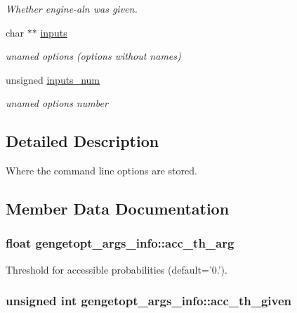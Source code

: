 \begin{DoxyCompactItemize}
\begin{DoxyCompactList}\small\item\em Whether engine-\/aln was given. \end{DoxyCompactList}\item 
char $\ast$$\ast$ \hyperlink{structgengetopt__args__info_a6fe9c1a32bc4c64a2ca4e3cfce05b147}{inputs}
\begin{DoxyCompactList}\small\item\em unamed options (options without names) \end{DoxyCompactList}\item 
unsigned \hyperlink{structgengetopt__args__info_a3d69c180d5ac0b1124fd9a6fe680706c}{inputs\+\_\+num}
\begin{DoxyCompactList}\small\item\em unamed options number \end{DoxyCompactList}\end{DoxyCompactItemize}


\subsection{Detailed Description}
Where the command line options are stored. 

\subsection{Member Data Documentation}
\hypertarget{structgengetopt__args__info_add7c709ed6c1601e389c7373250e4117}{
\subsubsection[{acc\+\_\+th\+\_\+arg}]{\setlength{\rightskip}{0pt plus 5cm}float gengetopt\+\_\+args\+\_\+info\+::acc\+\_\+th\+\_\+arg}}\label{structgengetopt__args__info_add7c709ed6c1601e389c7373250e4117}


Threshold for accessible probabilities (default='0.'). 

\hypertarget{structgengetopt__args__info_aceb5489e00facac0f7469af450fecc5f}{
\subsubsection[{acc\+\_\+th\+\_\+given}]{\setlength{\rightskip}{0pt plus 5cm}unsigned int gengetopt\+\_\+args\+\_\+info\+::acc\+\_\+th\+\_\+given}}\label{structgengetopt__args__info_aceb5489e00facac0f7469af450fecc5f}


